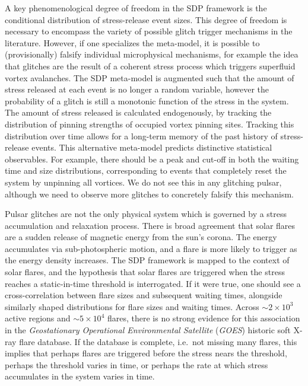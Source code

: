 A key phenomenological degree of freedom in the SDP framework is the conditional distribution of stress-release event sizes. This degree of freedom is necessary to encompass the variety of possible glitch trigger mechanisms in the literature. However, if one specializes the meta-model, it is possible to (provisionally) falsify individual microphysical mechanisms, for example the idea that glitches are the result of a coherent stress process which triggers superfluid vortex avalanches. The SDP meta-model is augmented such that the amount of stress released at each event is no longer a random variable, however the probability of a glitch is still a monotonic function of the stress in the system. The amount of stress released is calculated endogenously, by tracking the distribution of pinning strengths of occupied vortex pinning sites. Tracking this distribution over time allows for a long-term memory of the past history of stress-release events. This alternative meta-model predicts distinctive statistical observables. For example, there should be a peak and cut-off in both the waiting time and size distributions, corresponding to events that completely reset the system by unpinning all vortices. We do not see this in any glitching pulsar, although we need to observe more glitches to concretely falsify this mechanism. 

Pulsar glitches are not the only physical system which is governed by a stress accumulation and relaxation process. There is broad agreement that solar flares are a sudden release of magnetic energy from the sun's corona. The energy accumulates via sub-photospheric motion, and a flare is more likely to trigger as the energy density increases. The SDP framework is mapped to the context of solar flares, and the hypothesis that solar flares are triggered when the stress reaches a static-in-time threshold is interrogated. If it were true, one should see a cross-correlation between flare sizes and subsequent waiting times, alongside similarly shaped distributions for flare sizes and waiting times. Across $\sim2\times10^3$ active regions and $\sim5\times10^4$ flares, there is no strong evidence for this association in the \emph{Geostationary Operational Environmental Satellite} (\emph{GOES}) historic soft X-ray flare database. If the database is complete, i.e.~not missing many flares, this implies that perhaps flares are triggered before the stress nears the threshold, perhaps the threshold varies in time, or perhaps the rate at which stress accumulates in the system varies in time.

